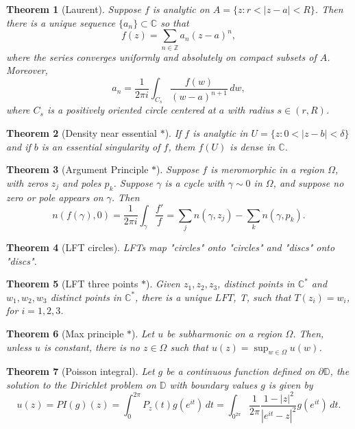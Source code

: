 \documentclass[12pt]{article}
\newtheorem{sats}{Theorem}
\theoremstyle{definition}
\newcommand{\D}{\mathbb{D}}      %
\newcommand{\Z}{\mathbb{Z}}
\newcommand{\C}{\mathbb{C}}    %
\begin{document}
\begin{sats}[Laurent]
    Suppose $f$ is analytic on $A=\{z:r<|z-a|<R\}$. Then there is a unique sequence $\{a_n\}\subset\C$ so that
    \begin{equation*}
        f(z)=\sum_{n\in\Z} a_n(z-a)^n,
    \end{equation*}
    where the series converges uniformly and absolutely on compact subsets of $A$. Moreover, 
    \begin{equation*}
        a_n=\frac{1}{2\pi i}\int_{C_s} \frac{f(w)}{(w-a)^{n+1}}\,dw,
    \end{equation*}
    where $C_s$ is a positively oriented circle centered at $a$ with radius $s\in(r,R)$.
\end{sats}

\begin{sats}[Density near essential $*$]
    If $f$ is analytic in $U=\{z:0<|z-b|<\delta\}$ and if $b$ is an essential singularity of $f$, them $f(U)$ is dense in $\C$.
\end{sats}

\begin{sats}[Argument Principle $*$]
    Suppose $f$ is meromorphic in a region $\Omega$, with zeros $z_j$ and poles $p_k$. Suppose $\gamma$ is a cycle with $\gamma\sim 0$ in $\Omega$, and suppose no zero or pole appears on $\gamma$. Then
    \begin{equation*}
        n(f(\gamma),0)=\frac{1}{2\pi i}\int_\gamma\frac{f'}{f} = \sum_j n(\gamma,z_j)-\sum_k n(\gamma,p_k).
    \end{equation*}
\end{sats}

\begin{sats}[LFT circles]
    LFTs map "circles" onto "circles" and "discs" onto "discs".
\end{sats}

\begin{sats}[LFT three points $*$]
    Given $z_1,z_2,z_3$, distinct points in $\C^*$ and $w_1,w_2,w_3$ distinct points in $\C^*$, there is a unique $LFT$, T, such that $T(z_i)=w_i$, for $i=1,2,3$.
\end{sats}

\begin{sats}[Max principle $*$]
    Let $u$ be subharmonic on a region $\Omega$. Then, unless $u$ is constant, there is no $z\in\Omega$ such that $u(z)=\sup_{w\in\Omega}u(w)$.
\end{sats}

\begin{sats}[Poisson integral]
    Let $g$ be a continuous function defined on $\partial\D$, the solution to the Dirichlet problem on $\D$ with boundary values $g$ is given by
    \begin{equation*}
        u(z)=PI(g)(z)=\int_0^{2\pi} P_z(t)g(e^{it})\,dt=\int_{0^{2\pi}}\frac{1}{2\pi}\frac{1-|z|^2}{|e^{it}-z|^2}g(e^{it})\,dt.
    \end{equation*}
\end{sats}
\end{document}
